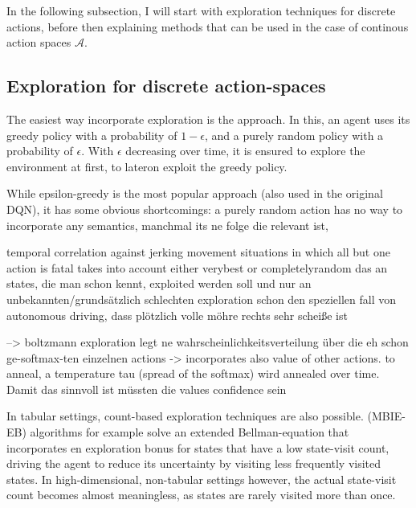 In the following subsection, I will start with exploration techniques for discrete actions, before then explaining methods that can be used in the case of continous action spaces $\mathcal{A}$.


\subsection{Exploration for discrete action-spaces}

The easiest way incorporate exploration is the  approach. In this, an agent uses its greedy policy with a probability of $1-\epsilon$, and a purely random policy with a probability of $\epsilon$. With $\epsilon$ decreasing over time, it is ensured to explore the environment at first, to lateron exploit the greedy policy. 

While epsilon-greedy is the most popular approach (also used in the original DQN), it has some obvious shortcomings: a purely random action has no way to incorporate any semantics, manchmal its ne folge die relevant ist, 

temporal correlation against jerking movement
situations in which all but one action is fatal
takes into account either verybest or completelyrandom
das an states, die man schon kennt, exploited werden soll und nur an unbekannten/grundsätzlich schlechten exploration 
schon den speziellen fall von autonomous driving, dass plötzlich volle möhre rechts sehr scheiße ist

--> boltzmann exploration legt ne wahrscheinlichkeitsverteilung über die eh schon ge-softmax-ten einzelnen actions -> incorporates also value of other actions. to anneal, a temperature tau (spread of the softmax) wird annealed over time. Damit das sinnvoll ist müssten die values confidence sein

In tabular settings, count-based exploration techniques are also possible.  (MBIE-EB) algorithms for example solve an extended Bellman-equation that incorporates en exploration bonus for states that have a low state-visit count, driving the agent to reduce its uncertainty by visiting less frequently visited states. In high-dimensional, non-tabular settings however, the actual state-visit count becomes almost meaningless, as states are rarely visited more than once.

